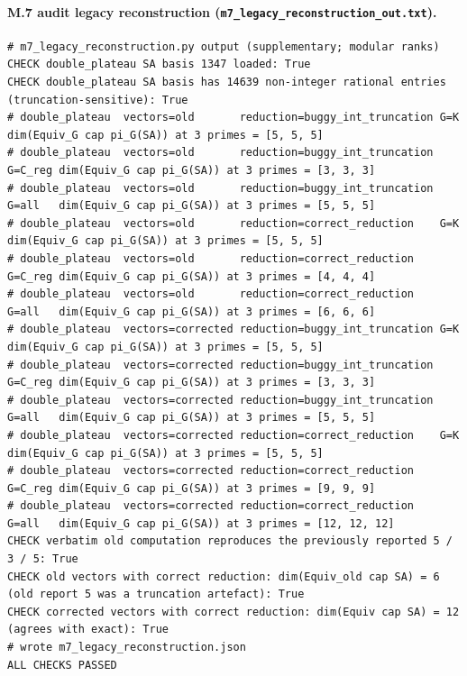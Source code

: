 \documentclass{article}
\theoremstyle{remark}
\begin{document}
\paragraph{M.7 audit legacy reconstruction (\texttt{m7\_legacy\_reconstruction\_out.txt}).}
\begin{lstlisting}
# m7_legacy_reconstruction.py output (supplementary; modular ranks)
CHECK double_plateau SA basis 1347 loaded: True
CHECK double_plateau SA basis has 14639 non-integer rational entries (truncation-sensitive): True
# double_plateau  vectors=old       reduction=buggy_int_truncation G=K     dim(Equiv_G cap pi_G(SA)) at 3 primes = [5, 5, 5]
# double_plateau  vectors=old       reduction=buggy_int_truncation G=C_reg dim(Equiv_G cap pi_G(SA)) at 3 primes = [3, 3, 3]
# double_plateau  vectors=old       reduction=buggy_int_truncation G=all   dim(Equiv_G cap pi_G(SA)) at 3 primes = [5, 5, 5]
# double_plateau  vectors=old       reduction=correct_reduction    G=K     dim(Equiv_G cap pi_G(SA)) at 3 primes = [5, 5, 5]
# double_plateau  vectors=old       reduction=correct_reduction    G=C_reg dim(Equiv_G cap pi_G(SA)) at 3 primes = [4, 4, 4]
# double_plateau  vectors=old       reduction=correct_reduction    G=all   dim(Equiv_G cap pi_G(SA)) at 3 primes = [6, 6, 6]
# double_plateau  vectors=corrected reduction=buggy_int_truncation G=K     dim(Equiv_G cap pi_G(SA)) at 3 primes = [5, 5, 5]
# double_plateau  vectors=corrected reduction=buggy_int_truncation G=C_reg dim(Equiv_G cap pi_G(SA)) at 3 primes = [3, 3, 3]
# double_plateau  vectors=corrected reduction=buggy_int_truncation G=all   dim(Equiv_G cap pi_G(SA)) at 3 primes = [5, 5, 5]
# double_plateau  vectors=corrected reduction=correct_reduction    G=K     dim(Equiv_G cap pi_G(SA)) at 3 primes = [5, 5, 5]
# double_plateau  vectors=corrected reduction=correct_reduction    G=C_reg dim(Equiv_G cap pi_G(SA)) at 3 primes = [9, 9, 9]
# double_plateau  vectors=corrected reduction=correct_reduction    G=all   dim(Equiv_G cap pi_G(SA)) at 3 primes = [12, 12, 12]
CHECK verbatim old computation reproduces the previously reported 5 / 3 / 5: True
CHECK old vectors with correct reduction: dim(Equiv_old cap SA) = 6 (old report 5 was a truncation artefact): True
CHECK corrected vectors with correct reduction: dim(Equiv cap SA) = 12 (agrees with exact): True
# wrote m7_legacy_reconstruction.json
ALL CHECKS PASSED
\end{lstlisting}
\end{document}
